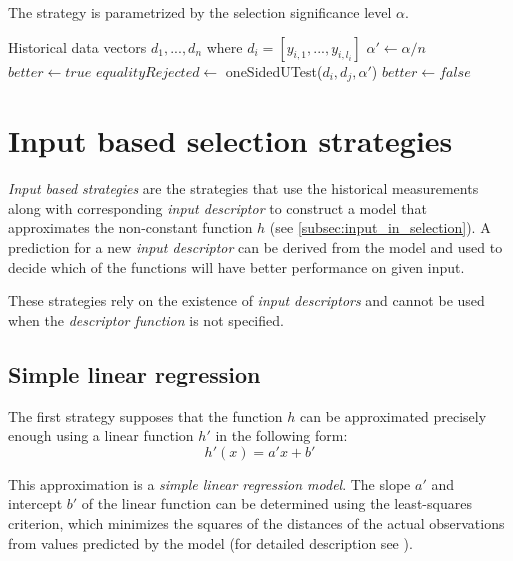 The strategy is parametrized by the selection significance level $\alpha$.

\begin{algorithmic}[1] %
	\INPUT Historical data vectors $d_1,...,d_n$ where $d_i = [y_{i,1},...,y_{i,l_i}]$
	\State$\alpha' \gets \alpha / n$
	\State $better \gets true$
	\State $equalityRejected \gets$ oneSidedUTest($d_i, d_j, \alpha'$)
	\State $better \gets false$
	\EndIf
	\EndFor
	\State {}
	\EndIf
	\EndFor
	\State {}
	
\end{algorithmic}

\section{Input based selection strategies}
\label{sec:input_based_strategies}

\textit{Input based strategies} are the strategies that use the historical measurements along with corresponding \textit{input descriptor} to construct a model that approximates the non-constant function $h$ (see \ref{subsec:input_in_selection}). A prediction for a new \textit{input descriptor} can be derived from the model and used to decide which of the functions will have better performance on given input.

These strategies rely on the existence of \textit{input descriptors} and cannot be used when the \textit{descriptor function} is not specified.

\subsection{Simple linear regression}
\label{subsec:simple_linear_regression}

The first strategy supposes that the function \(h\) can be approximated precisely enough using a linear function \(h'\) in the following form:
\[h'(x) = a' x + b'\]

This approximation is a \textit{simple linear regression model}. The slope \(a'\) and intercept \(b'\) of the linear function can be determined using the least-squares criterion, which minimizes the squares of the distances of the actual observations from values predicted by the model (for detailed description see \cite{weiss_introductory_2010}).

